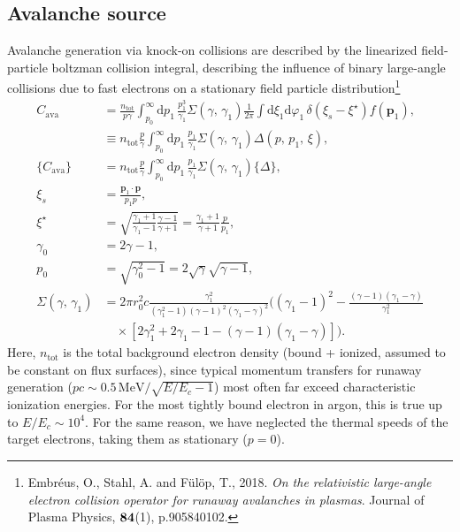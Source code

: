 \documentclass[11pt,a4paper]{article}
\newcommand{\rd}{\ensuremath{\mathrm{d}}}
\newcommand{\sub}[1]{\ensuremath{_{\text{#1}}}}
\renewcommand{\b}[1]{\ensuremath{ {\bf #1 } }}
\begin{document}
\subsection{Avalanche source}
Avalanche generation via knock-on collisions are described by the linearized field-particle boltzman collision integral, describing the influence of binary large-angle collisions due to fast electrons on a stationary field particle distribution\footnote{Embréus, O., Stahl, A. and Fülöp, T., 2018. \emph{On the relativistic large-angle electron collision operator for runaway avalanches in plasmas}. Journal of Plasma Physics, \b{84}(1), p.905840102.}
\begin{align}
C\sub{ava} &= \frac{n\sub{tot}}{p\gamma}\int_{p_0}^\infty\rd p_1\,\frac{p_1^3}{\gamma_1}\Sigma(\gamma,\,\gamma_1)\frac{1}{2\pi}\int\rd\xi_1\rd\varphi_1\,\delta(\xi_s-\xi^\star)f(\mathbf{p}_1), \nonumber \\
&\equiv n\sub{tot}\frac{p}{\gamma}\int_{p_0}^\infty\rd p_1\,\frac{p_1}{\gamma_1}\Sigma(\gamma,\,\gamma_1)\Delta(p,\,p_1,\,\xi),
\\
\{C\sub{ava}\} &= n\sub{tot}\frac{p}{\gamma}\int_{p_0}^\infty\rd p_1\,\frac{p_1}{\gamma_1}\Sigma(\gamma,\,\gamma_1)\{\Delta\}, \\
\xi_s &= \frac{\mathbf{p}_1\cdot\mathbf{p}}{p_1 p}, \\
\xi^\star &= \sqrt{\frac{\gamma_1+1}{\gamma_1-1}\frac{\gamma-1}{\gamma+1}} = \frac{\gamma_1+1}{\gamma+1}\frac{p}{p_1}, \\
\gamma_0 &= 	2\gamma-1, \nonumber \\
p_0 &= \sqrt{\gamma_0^2 - 1} = 2\sqrt{\gamma}\sqrt{\gamma-1}, \\
\Sigma(\gamma,\,\gamma_1) &= 2\pi r_0^2 c \frac{\gamma_1^2}{(\gamma_1^2-1)(\gamma-1)^2(\gamma_1-\gamma)^2}\biggl(
(\gamma_1-1)^2 - \frac{(\gamma-1)(\gamma_1-\gamma)}{\gamma_1^2} \nonumber\\
&\quad\times \left[2\gamma_1^2 + 2\gamma_1 - 1 - (\gamma-1)(\gamma_1-\gamma)\right]
\biggr).
\end{align}
Here, $n\sub{tot}$ is the total background electron density (bound + ionized, assumed to be constant on flux surfaces), since typical momentum transfers for runaway generation ($pc \sim 0.5\,\mathrm{MeV}/\sqrt{E/E_c - 1}$) most often far exceed characteristic ionization energies. For the most tightly bound electron in argon, this is true up to $E/E_c \sim 10^4$. For the same reason, we have neglected the thermal speeds of the target electrons, taking them as stationary ($p=0$).
\end{document}
